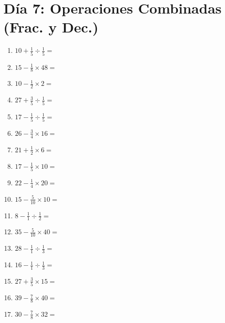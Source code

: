 \documentclass[12pt]{article}
\begin{document}
\section*{Día 7: Operaciones Combinadas (Frac. y Dec.)}
\begin{enumerate}
\item \large $ 10 + \frac{1}{5} \div \frac{1}{5} = $ \vspace{1.6cm}
\item \large $ 15 - \frac{1}{8} \times 48 = $ \vspace{1.6cm}
\item \large $ 10 - \frac{1}{2} \times 2 = $ \vspace{1.6cm}
\item \large $ 27 + \frac{3}{5} \div \frac{1}{5} = $ \vspace{1.6cm}
\item \large $ 17 - \frac{1}{5} \div \frac{1}{5} = $ \vspace{1.6cm}
\item \large $ 26 - \frac{3}{4} \times 16 = $ \vspace{1.6cm}
\item \large $ 21 + \frac{1}{2} \times 6 = $ \vspace{1.6cm}
\item \large $ 17 - \frac{1}{5} \times 10 = $ \vspace{1.6cm}
\item \large $ 22 - \frac{1}{4} \times 20 = $ \vspace{1.6cm}
\item \large $ 15 - \frac{5}{10} \times 10 = $ \vspace{1.6cm}
\newpage
\item \large $ 8 - \frac{1}{1} \div \frac{1}{2} = $ \vspace{1.6cm}
\item \large $ 35 - \frac{5}{10} \times 40 = $ \vspace{1.6cm}
\item \large $ 28 - \frac{1}{1} \div \frac{1}{3} = $ \vspace{1.6cm}
\item \large $ 16 - \frac{1}{1} \div \frac{1}{3} = $ \vspace{1.6cm}
\item \large $ 27 + \frac{3}{5} \times 15 = $ \vspace{1.6cm}
\item \large $ 39 - \frac{7}{8} \times 40 = $ \vspace{1.6cm}
\item \large $ 30 - \frac{7}{8} \times 32 = $ \vspace{1.6cm}

\end{enumerate}
\end{document}
